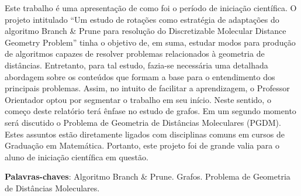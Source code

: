 \documentclass[
	12pt,				%
	openright,			%
	twoside,			%
	a4paper,			%
	english,			%
	french,				%
	spanish,			%
	brazil				%
	]{abntex2}
\begin{document}

      
  





 \setlength{\absparsep}{18pt} %
 \begin{resumo}
  Este trabalho é uma apresentação de como foi o período de iniciação científica. O projeto intitulado ``Um estudo de rotações como estratégia de adaptações do algoritmo Branch \& Prune para resolução do Discretizable Molecular Distance Geometry Problem'' tinha o objetivo de, em suma, estudar modos para produção de algoritmos capazes de resolver problemas relacionados à geometria de distâncias. Entretanto, para tal estudo, fazia-se necessária uma detalhada abordagem sobre os conteúdos que formam a base para o entendimento dos principais problemas. Assim, no intuito de facilitar a aprendizagem, o Professor Orientador optou por segmentar o trabalho em seu início. Neste sentido, o começo deste relatório terá ênfase no estudo de grafos. Em um segundo momento será discutido o Problema de Geometria de Distâncias Moleculares (PGDM). Estes assuntos estão diretamente ligados com disciplinas comuns em cursos de Graduação em Matemática. Portanto, este projeto foi de grande valia para o aluno de iniciação científica em questão. 

  \textbf{Palavras-chaves}: Algoritmo Branch \& Prune. Grafos. Problema de Geometria de Distâncias Moleculares.
 \end{resumo}
\end{document}
